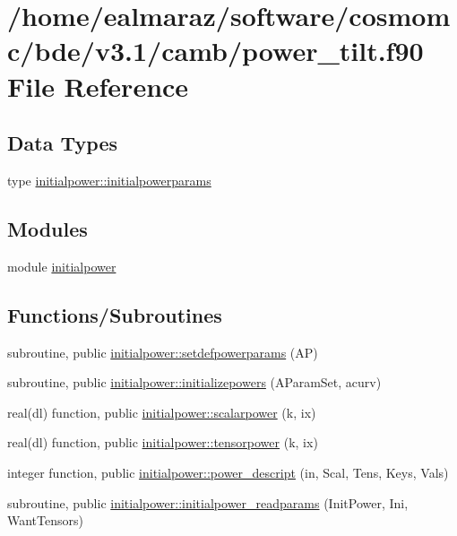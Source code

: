 \hypertarget{power__tilt_8f90}{}\section{/home/ealmaraz/software/cosmomc/bde/v3.1/camb/power\+\_\+tilt.f90 File Reference}
\label{power__tilt_8f90}
\subsection*{Data Types}
\begin{DoxyCompactItemize}
\item 
type \mbox{\hyperlink{structinitialpower_1_1initialpowerparams}{initialpower\+::initialpowerparams}}
\end{DoxyCompactItemize}
\subsection*{Modules}
\begin{DoxyCompactItemize}
\item 
module \mbox{\hyperlink{namespaceinitialpower}{initialpower}}
\end{DoxyCompactItemize}
\subsection*{Functions/\+Subroutines}
\begin{DoxyCompactItemize}
\item 
subroutine, public \mbox{\hyperlink{namespaceinitialpower_a0af6f4d15e7cc386f038c557a83256e1}{initialpower\+::setdefpowerparams}} (AP)
\item 
subroutine, public \mbox{\hyperlink{namespaceinitialpower_aa7485ddfdf405ed8912c8070fef8af62}{initialpower\+::initializepowers}} (A\+Param\+Set, acurv)
\item 
real(dl) function, public \mbox{\hyperlink{namespaceinitialpower_a2263ec918226f30880a9efbedf684be8}{initialpower\+::scalarpower}} (k, ix)
\item 
real(dl) function, public \mbox{\hyperlink{namespaceinitialpower_aa1fdc1f3bcc69e61d7f690fa3ffd7f02}{initialpower\+::tensorpower}} (k, ix)
\item 
integer function, public \mbox{\hyperlink{namespaceinitialpower_a44d725f2b2b68cb9ea810423c9b4d8c4}{initialpower\+::power\+\_\+descript}} (in, Scal, Tens, Keys, Vals)
\item 
subroutine, public \mbox{\hyperlink{namespaceinitialpower_aad1ed45315709769eb35a28cbc8731f1}{initialpower\+::initialpower\+\_\+readparams}} (Init\+Power, Ini, Want\+Tensors)
\end{DoxyCompactItemize}
